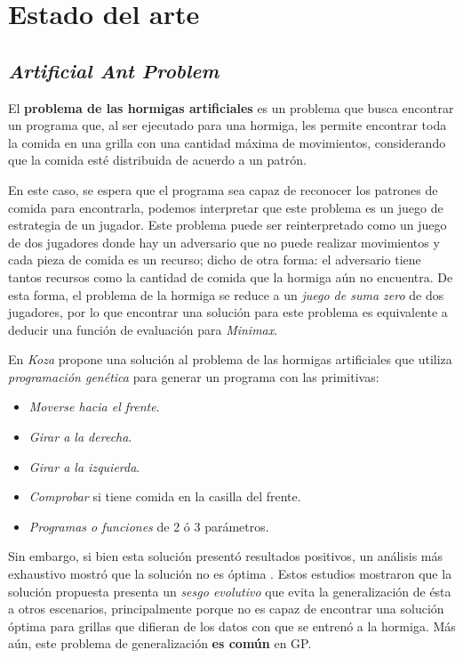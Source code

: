 \section{Estado del arte}
  \subsection{\textit{Artificial Ant Problem}}
    El \textbf{problema de las hormigas artificiales} 
    \autocite{jeffersonGenesysSystemEvolution1990,kozaGeneticProgrammingMeans1994a} es un problema 
    que busca encontrar un programa que, al ser 
    ejecutado para una hormiga, les permite encontrar toda la comida en una grilla con una cantidad 
    máxima de movimientos, considerando que la comida esté distribuida de acuerdo a un patrón.

    En este caso, se espera que el programa sea capaz de reconocer los patrones de comida para 
    encontrarla, podemos interpretar que este problema es un juego de estrategia de un jugador.
    Este problema puede ser reinterpretado como un juego de dos jugadores donde hay un adversario
    que no puede realizar movimientos y cada pieza de comida es un recurso; dicho de otra forma:
    el adversario tiene tantos recursos como la cantidad de comida que la hormiga aún no encuentra.
    De esta forma, el problema de la hormiga se reduce a un \textit{juego de suma zero} de dos 
    jugadores, por lo que encontrar una solución para este problema es equivalente a deducir una
    función de evaluación para \textit{Minimax}.
    
    En \cite{kozaGeneticProgrammingMeans1994a} \textit{Koza} propone una solución al problema de las
    hormigas artificiales que utiliza \textit{programación genética} para generar un programa con 
    las primitivas:
    \begin{itemize}
      \item \textit{Moverse hacia el frente}.
      \item \textit{Girar a la derecha}.
      \item \textit{Girar a la izquierda}.
      \item \textit{Comprobar} si tiene comida en la casilla del frente.
      \item \textit{Programas o funciones} de 2 ó 3 parámetros.
    \end{itemize}
 
    Sin embargo, si bien esta solución presentó resultados positivos, un análisis más exhaustivo
    mostró que la solución no es óptima \autocite{kuscuEvolvingGeneralisedBehaviour1998}.
    Estos estudios mostraron que la solución propuesta presenta un \textit{sesgo evolutivo} que
    evita la generalización de ésta a otros escenarios, principalmente porque no es capaz de
    encontrar una solución óptima para grillas que difieran de los datos con que se entrenó a la
    hormiga.
    Más aún, este problema de generalización \textbf{es común} en GP.

